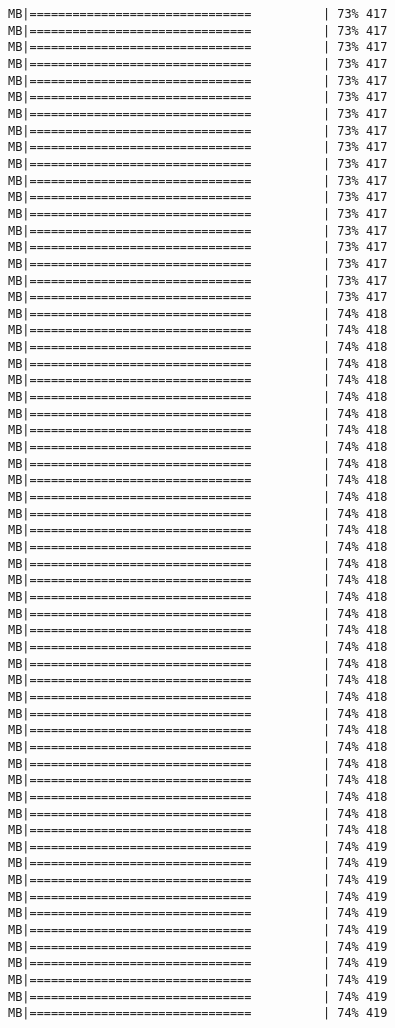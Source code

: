 \documentclass[
]{article}
\begin{document}
\begin{verbatim}
MB|===============================          | 73% 417 MB|===============================          | 73% 417 MB|===============================          | 73% 417 MB|===============================          | 73% 417 MB|===============================          | 73% 417 MB|===============================          | 73% 417 MB|===============================          | 73% 417 MB|===============================          | 73% 417 MB|===============================          | 73% 417 MB|===============================          | 73% 417 MB|===============================          | 73% 417 MB|===============================          | 73% 417 MB|===============================          | 73% 417 MB|===============================          | 73% 417 MB|===============================          | 73% 417 MB|===============================          | 73% 417 MB|===============================          | 73% 417 MB|===============================          | 73% 417 MB|===============================          | 74% 418 MB|===============================          | 74% 418 MB|===============================          | 74% 418 MB|===============================          | 74% 418 MB|===============================          | 74% 418 MB|===============================          | 74% 418 MB|===============================          | 74% 418 MB|===============================          | 74% 418 MB|===============================          | 74% 418 MB|===============================          | 74% 418 MB|===============================          | 74% 418 MB|===============================          | 74% 418 MB|===============================          | 74% 418 MB|===============================          | 74% 418 MB|===============================          | 74% 418 MB|===============================          | 74% 418 MB|===============================          | 74% 418 MB|===============================          | 74% 418 MB|===============================          | 74% 418 MB|===============================          | 74% 418 MB|===============================          | 74% 418 MB|===============================          | 74% 418 MB|===============================          | 74% 418 MB|===============================          | 74% 418 MB|===============================          | 74% 418 MB|===============================          | 74% 418 MB|===============================          | 74% 418 MB|===============================          | 74% 418 MB|===============================          | 74% 418 MB|===============================          | 74% 418 MB|===============================          | 74% 418 MB|===============================          | 74% 418 MB|===============================          | 74% 419 MB|===============================          | 74% 419 MB|===============================          | 74% 419 MB|===============================          | 74% 419 MB|===============================          | 74% 419 MB|===============================          | 74% 419 MB|===============================          | 74% 419 MB|===============================          | 74% 419 MB|===============================          | 74% 419 MB|===============================          | 74% 419 MB|===============================          | 74% 419 
\end{verbatim}
\end{document}
